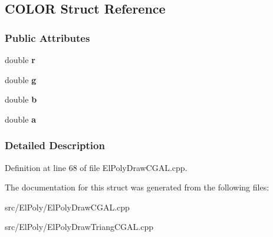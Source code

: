 \hypertarget{structCOLOR}{}\subsection{C\+O\+L\+OR Struct Reference}
\label{structCOLOR}
\subsubsection*{Public Attributes}
\begin{DoxyCompactItemize}
\item 
double {\bfseries r}\hypertarget{structCOLOR_a880a49112fedae68e714341a9a082fb6}{}\label{structCOLOR_a880a49112fedae68e714341a9a082fb6}

\item 
double {\bfseries g}\hypertarget{structCOLOR_ab30c765b9be1b7776c97c899a12a66bb}{}\label{structCOLOR_ab30c765b9be1b7776c97c899a12a66bb}

\item 
double {\bfseries b}\hypertarget{structCOLOR_a1510a66dacf9cf3586de5fc89ae2a073}{}\label{structCOLOR_a1510a66dacf9cf3586de5fc89ae2a073}

\item 
double {\bfseries a}\hypertarget{structCOLOR_a1031d0e0a97a340abfe0a6ab9e831045}{}\label{structCOLOR_a1031d0e0a97a340abfe0a6ab9e831045}

\end{DoxyCompactItemize}


\subsubsection{Detailed Description}


Definition at line 68 of file El\+Poly\+Draw\+C\+G\+A\+L.\+cpp.



The documentation for this struct was generated from the following files\+:\begin{DoxyCompactItemize}
\item 
src/\+El\+Poly/El\+Poly\+Draw\+C\+G\+A\+L.\+cpp\item 
src/\+El\+Poly/El\+Poly\+Draw\+Triang\+C\+G\+A\+L.\+cpp\end{DoxyCompactItemize}
